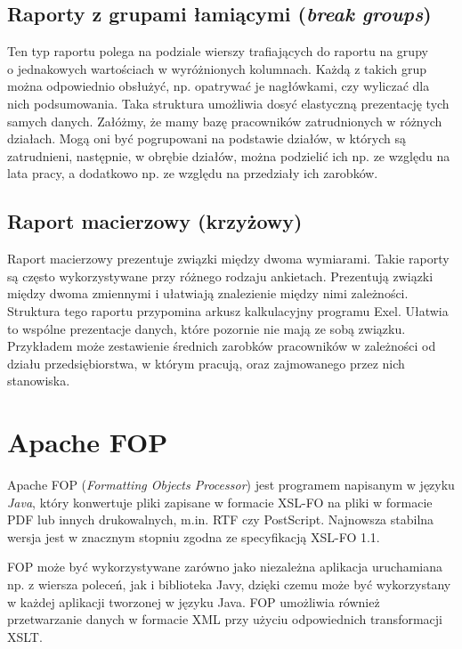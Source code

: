 \documentclass[11pt,a4paper]{article}
\begin{document}
\subsection{Raporty z grupami łamiącymi (\emph{break groups})}\label{sec:break_groups}
Ten typ raportu polega na podziale wierszy trafiających do raportu na grupy \\o jednakowych wartościach w wyróżnionych kolumnach. Każdą z takich grup można odpowiednio obsłużyć, np. opatrywać je nagłówkami, czy wyliczać dla nich podsumowania. Taka struktura umożliwia dosyć elastyczną prezentację tych samych danych. Załóżmy, że mamy bazę pracowników zatrudnionych w różnych działach. Mogą oni być pogrupowani na podstawie działów, w których są zatrudnieni, następnie, w obrębie działów, można podzielić ich np. ze względu na lata pracy, a dodatkowo np. ze względu na przedziały ich zarobków. 
\subsection{Raport macierzowy (krzyżowy)}\label{sec:macierzowy}
Raport macierzowy prezentuje związki między dwoma wymiarami. Takie raporty są często wykorzystywane przy różnego rodzaju ankietach. Prezentują związki między dwoma zmiennymi i ułatwiają znalezienie między nimi zależności. Struktura tego raportu przypomina arkusz kalkulacyjny programu Exel. Ułatwia to wspólne prezentacje danych, które pozornie nie mają ze sobą związku. Przykładem może zestawienie średnich zarobków pracowników w zależności od działu przedsiębiorstwa, w którym pracują, oraz zajmowanego przez nich stanowiska.


\section{Apache FOP}\label{sec:fop}
Apache FOP (\emph{Formatting Objects Processor}) jest programem napisanym w języku \emph{Java}, który konwertuje pliki zapisane w formacie XSL-FO na pliki w formacie PDF lub innych drukowalnych, m.in. RTF czy PostScript. Najnowsza stabilna wersja jest w znacznym stopniu zgodna ze specyfikacją XSL-FO 1.1. 

FOP może być wykorzystywane zarówno jako niezależna aplikacja uruchamiana np. z wiersza poleceń, jak i biblioteka Javy, dzięki czemu może być wykorzystany w każdej aplikacji tworzonej w języku Java. FOP umożliwia również przetwarzanie danych w formacie XML przy użyciu odpowiednich transformacji XSLT.

\end{document}
